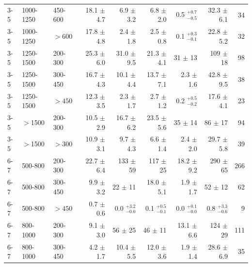 \begin{table}[!t]
{\begin{tabular}{lll|r|r|r|r|r|r}
      3-5     & 1000-1250  & 450-600  &   18.1 $\pm$    4.7       &    6.9 $\pm$    3.2      &   6.8 $\pm$    2.0      &  0.5 $^{+0.7}_{-0.5}$       & 32.3   $\pm$    6.1    &    34  \\
      3-5     & 1000-1250  & $>600$   &   17.8 $\pm$    4.8       &    2.4 $\pm$    1.8      &   2.5 $\pm$    0.8      &  0.1 $^{+0.3}_{-0.1}$       & 22.8   $\pm$    5.2    &    32  \\ \hline
      3-5     & 1250-1500  & 200-300  &   25.3 $\pm$    6.0       &   31.0 $\pm$    9.5      &  21.3 $\pm$    4.1      & 31   $\pm$   13         & 109    $\pm$   18      &    98  \\
      3-5     & 1250-1500  & 300-450  &   16.7 $\pm$    4.3       &   10.1 $\pm$    4.4      &  13.7 $\pm$    7.1      &  2.3 $\pm$    1.6       & 42.8   $\pm$    9.5    &    38  \\
      3-5     & 1250-1500  & $>450$   &   12.3 $\pm$    3.5       &    2.3 $\pm$    1.7      &   2.7 $\pm$    1.2      &  0.2 $^{+0.5}_{-0.2}$       & 17.6   $\pm$    4.1    &    23  \\ \hline
      3-5     & $>$1500    & 200-300  &   10.5 $\pm$    2.9       &   16.7 $\pm$    6.2      &  23.5 $\pm$    5.6      & 35   $\pm$   14         & 86     $\pm$   17      &    94  \\
      3-5     & $>$1500    & $>300$   &   10.9 $\pm$    3.1       &    9.7 $\pm$    4.3      &   6.6 $\pm$    1.4      &  2.4 $\pm$    2.0       & 29.7   $\pm$    5.8    &    39  \\ \hline \hline
      6-7     & 500-800    & 200-300  &   22.7 $\pm$    6.4       &  133   $\pm$   59        & 117   $\pm$   25        & 18.2 $\pm$    9.2       & 290    $\pm$   65      &   266  \\
      6-7     & 500-800    & 300-450  &    9.9 $\pm$    3.2       &   22   $\pm$   11        &  18.0 $\pm$    5.1      &  1.9 $\pm$    1.7       & 52     $\pm$   12      &    62  \\
      6-7     & 500-800    & $>450$   &    0.7 $\pm$    0.6       &    0.0 $^{+3.2}_{-0.0}$      &   0.1 $^{+0.5}_{-0.1}$      &  0.0 $^{+0.1}_{-0.0}$       & 0.8    $^{+3.3}_{-0.6}$    &     9  \\ \hline
      6-7     & 800-1000   & 200-300  &    9.1 $\pm$    3.0       &   56   $\pm$   25        &  46   $\pm$   11        & 13.1 $\pm$    6.6       & 124    $\pm$   29      &   111  \\
      6-7     & 800-1000   & 300-450  &    4.2 $\pm$    1.7       &   10.4 $\pm$    5.5      &  12.0 $\pm$    3.6      &  1.9 $\pm$    1.4       & 28.6   $\pm$    6.9    &    35  \\

\end{tabular}}
\end{table}
